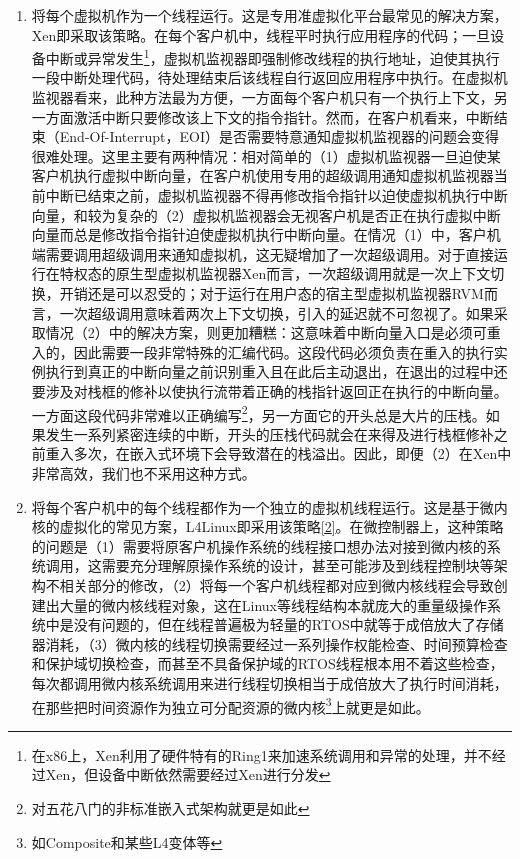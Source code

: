 \begin{enumerate}
\def\labelenumi{{[}\arabic{enumi}{]}}
\item
  将每个虚拟机作为一个线程运行。这是专用准虚拟化平台最常见的解决方案，Xen即采取该策略。在每个客户机中，线程平时执行应用程序的代码；一旦设备中断或异常发生\footnote{在x86上，Xen利用了硬件特有的Ring1来加速系统调用和异常的处理，并不经过Xen，但设备中断依然需要经过Xen进行分发}，虚拟机监视器即强制修改线程的执行地址，迫使其执行一段中断处理代码，待处理结束后该线程自行返回应用程序中执行。在虚拟机监视器看来，此种方法最为方便，一方面每个客户机只有一个执行上下文，另一方面激活中断只要修改该上下文的指令指针。然而，在客户机看来，中断结束（End-Of-Interrupt，EOI）是否需要特意通知虚拟机监视器的问题会变得很难处理。这里主要有两种情况：相对简单的（1）虚拟机监视器一旦迫使某客户机执行虚拟中断向量，在客户机使用专用的超级调用通知虚拟机监视器当前中断已结束之前，虚拟机监视器不得再修改指令指针以迫使虚拟机执行中断向量，和较为复杂的（2）虚拟机监视器会无视客户机是否正在执行虚拟中断向量而总是修改指令指针迫使虚拟机执行中断向量。在情况（1）中，客户机端需要调用超级调用来通知虚拟机，这无疑增加了一次超级调用。对于直接运行在特权态的原生型虚拟机监视器Xen而言，一次超级调用就是一次上下文切换，开销还是可以忍受的；对于运行在用户态的宿主型虚拟机监视器RVM而言，一次超级调用意味着两次上下文切换，引入的延迟就不可忽视了。如果采取情况（2）中的解决方案，则更加糟糕：这意味着中断向量入口是必须可重入的，因此需要一段非常特殊的汇编代码。这段代码必须负责在重入的执行实例执行到真正的中断向量之前识别重入且在此后主动退出，在退出的过程中还要涉及对栈框的修补以使执行流带着正确的栈指针返回正在执行的中断向量。一方面这段代码非常难以正确编写\footnote{对五花八门的非标准嵌入式架构就更是如此}，另一方面它的开头总是大片的压栈。如果发生一系列紧密连续的中断，开头的压栈代码就会在来得及进行栈框修补之前重入多次，在嵌入式环境下会导致潜在的栈溢出。因此，即便（2）在Xen中非常高效，我们也不采用这种方式。
\item
  将每个客户机中的每个线程都作为一个独立的虚拟机线程运行。这是基于微内核的虚拟化的常见方案，L4Linux即采用该策略\protect\hyperref[cite:2-2]{{[}2{]}}。在微控制器上，这种策略的问题是（1）需要将原客户机操作系统的线程接口想办法对接到微内核的系统调用，这需要充分理解原操作系统的设计，甚至可能涉及到线程控制块等架构不相关部分的修改，（2）将每一个客户机线程都对应到微内核线程会导致创建出大量的微内核线程对象，这在Linux等线程结构本就庞大的重量级操作系统中是没有问题的，但在线程普遍极为轻量的RTOS中就等于成倍放大了存储器消耗，（3）微内核的线程切换需要经过一系列操作权能检查、时间预算检查和保护域切换检查，而甚至不具备保护域的RTOS线程根本用不着这些检查，每次都调用微内核系统调用来进行线程切换相当于成倍放大了执行时间消耗，在那些把时间资源作为独立可分配资源的微内核\footnote{如Composite和某些L4变体等}上就更是如此。


\end{enumerate}
